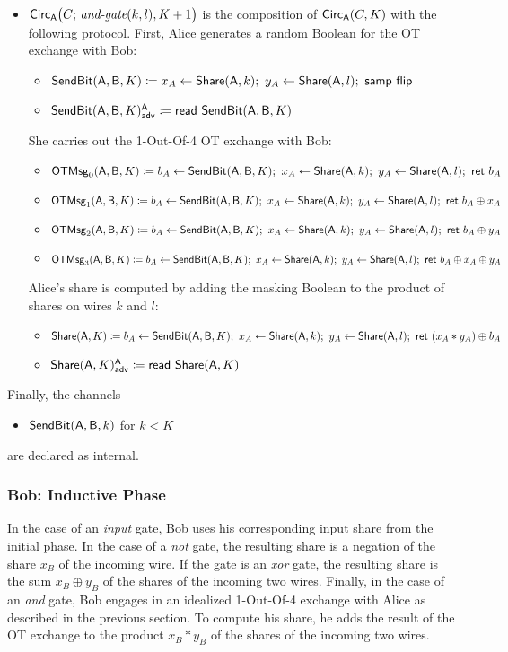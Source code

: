 \begin{itemize}
\item $\mathsf{Circ}_{\mathsf{A}}\big(C; \, \textit{and-gate}(k,l),K+1\big)$ is the composition of $\mathsf{Circ}_{\mathsf{A}}(C,K)$ with the following protocol. First, Alice generates a random Boolean for the OT exchange with Bob:
\begin{itemize}
\item $\SendBit(\A,\B,K) \coloneqq x_A \leftarrow \Share(\A,k); \ y_A \leftarrow \Share(\A,l); \ \samp{\flip}$
\item {\color{blue} $\mathsf{SendBit}(\mathsf{A},\mathsf{B},K)^{\mathsf{A}}_{\mathsf{adv}} \coloneqq \mathsf{read} \ \mathsf{SendBit}(\mathsf{A},\mathsf{B},K)$}
\end{itemize}
She carries out the 1-Out-Of-4 OT exchange with Bob:
\begin{itemize}
\item $\mathsf{OTMsg}_0(\mathsf{A},\mathsf{B},K) \coloneqq b_A \leftarrow \mathsf{SendBit}(\mathsf{A},\mathsf{B},K); \ x_A \leftarrow \mathsf{Share}(\mathsf{A},k); \ y_A \leftarrow \mathsf{Share}(\mathsf{A},l); \ \mathsf{ret} \ b_A$
\item $\mathsf{OTMsg}_1(\mathsf{A},\mathsf{B},K) \coloneqq b_A \leftarrow \mathsf{SendBit}(\mathsf{A},\mathsf{B},K); \ x_A \leftarrow \mathsf{Share}(\mathsf{A},k); \ y_A \leftarrow \mathsf{Share}(\mathsf{A},l); \ \mathsf{ret} \ b_A \oplus x_A$
\item $\mathsf{OTMsg}_2(\mathsf{A},\mathsf{B},K) \coloneqq b_A \leftarrow \mathsf{SendBit}(\mathsf{A},\mathsf{B},K); \ x_A \leftarrow \mathsf{Share}(\mathsf{A},k); \ y_A \leftarrow \mathsf{Share}(\mathsf{A},l); \ \mathsf{ret} \ b_A \oplus y_A$
\item $\mathsf{OTMsg}_3(\mathsf{A},\mathsf{B},K) \coloneqq b_A \leftarrow \mathsf{SendBit}(\mathsf{A},\mathsf{B},K); \ x_A \leftarrow \mathsf{Share}(\mathsf{A},k); \ y_A \leftarrow \mathsf{Share}(\mathsf{A},l); \ \mathsf{ret} \ b_A \oplus x_A \oplus y_A$
\end{itemize}
Alice's share is computed by adding the masking Boolean to the product of shares on wires $k$ and $l$:
\begin{itemize}
\item $\mathsf{Share}(\mathsf{A},K) \coloneqq b_A \leftarrow \mathsf{SendBit}(\mathsf{A},\mathsf{B},K); \ x_A \leftarrow \mathsf{Share}(\mathsf{A},k); \ y_A \leftarrow \mathsf{Share}(\mathsf{A},l); \ \mathsf{ret} \ (x_A * y_A) \oplus b_A$
\item {\color{blue} $\mathsf{Share}(\mathsf{A},K)^{\mathsf{A}}_{\mathsf{adv}} \coloneqq \mathsf{read} \ \mathsf{Share}(\mathsf{A},K)$}
\end{itemize}
\end{itemize}
Finally, the channels
\begin{itemize}
\item $\mathsf{SendBit}(\mathsf{A},\mathsf{B},k)$ for $k < K$
\end{itemize}
are declared as internal.

\subsubsection{Bob: Inductive Phase}
In the case of an \emph{input} gate, Bob uses his corresponding input share from the initial phase. In the case of a \emph{not} gate, the resulting share is a negation of the share $x_B$ of the incoming wire. If the gate is an \emph{xor} gate, the resulting share is the sum $x_B \oplus y_B$ of the shares of the incoming two wires. Finally, in the case of an \emph{and} gate, Bob engages in an idealized 1-Out-Of-4 exchange with Alice as described in the previous section. To compute his share, he adds the result of the OT exchange to the product $x_B * y_B$ of the shares of the incoming two wires.\medskip

